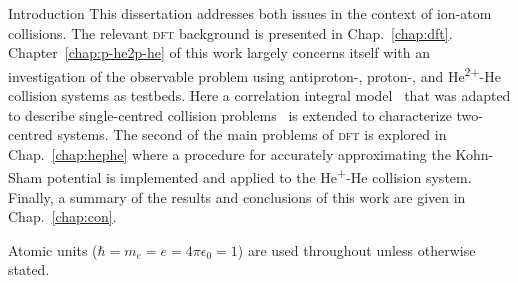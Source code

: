 \documentclass[letterpaper, 11 pt]{report}
\begin{document}
\begin{chapter}{Introduction \label{chap:intro}}
   This dissertation addresses both issues in the context of ion-atom collisions. The relevant
   \textsc{dft} background is presented in Chap.~\ref{chap:dft}. Chapter~\ref{chap:p-he2p-he} of this
   work largely concerns itself with an investigation of the observable problem using antiproton-,
   proton-, and He\textsuperscript{2+}-He collision systems as testbeds. Here a correlation integral
   model~\cite{wb} that was adapted to describe single-centred collision problems~\cite{pbarhe} is
   extended to characterize two-centred systems. The second of the main problems of \textsc{dft} is
   explored in Chap.~\ref{chap:hephe} where a procedure for accurately approximating the Kohn-Sham
   potential is implemented and applied to the He\textsuperscript{+}-He collision system. Finally, a
   summary of the results and conclusions of this work are given in Chap.~\ref{chap:con}.

   Atomic units ($\hbar = m_e = e = 4 \pi \epsilon_0 = 1$) are used throughout unless otherwise stated.

\end{chapter}
\end{document}
